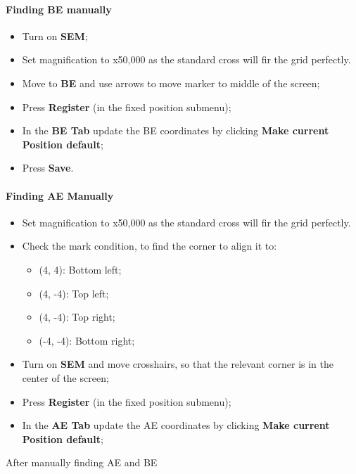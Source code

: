 \paragraph{Finding BE manually}
\begin{itemize}
\item Turn on \textbf{SEM};
  \item Set magnification to x50,000 as the standard cross will fir the grid perfectly.
\item Move to \textbf{BE} and use arrows to move marker to middle of the screen;
\item Press \textbf{Register} (in the fixed position submenu);
\item In the \textbf{BE Tab} update  the BE coordinates by clicking \textbf{Make
    current Position default};
\item Press \textbf{Save}.
\end{itemize}

\paragraph{Finding AE Manually}

\begin{itemize}
\item Set magnification to x50,000 as the standard cross will fir the grid perfectly.
\item Check the mark condition, to find the corner to align it to:
  \begin{itemize}
  \item (4, 4): Bottom left;
  \item (4, -4): Top left;
  \item (4, -4): Top right;
  \item (-4, -4): Bottom right;
  \end{itemize}
\item Turn on  \textbf{SEM} and move crosshairs, so that  the relevant corner is
  in the center of the screen;
\item Press \textbf{Register} (in the fixed position submenu);
\item In the \textbf{AE Tab} update  the AE coordinates by clicking \textbf{Make
    current Position default};
\end{itemize}

\begin{framed}\noindent
  After manually finding AE and  BE 
\end{framed}

